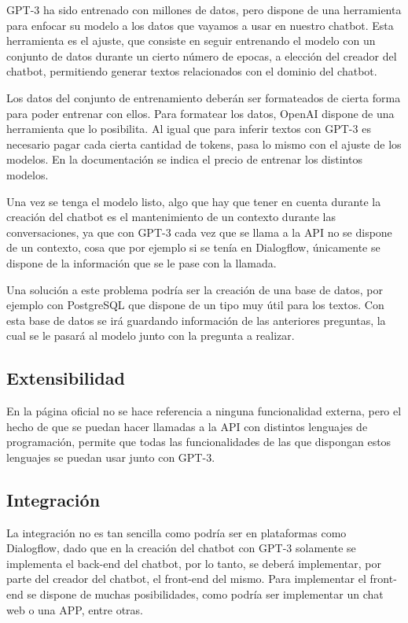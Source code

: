 GPT-3 ha sido entrenado con millones de datos, pero dispone de una herramienta para enfocar su modelo a los datos que vayamos a usar en nuestro chatbot. Esta herramienta es el ajuste, que consiste en seguir entrenando el modelo con un conjunto de datos durante un cierto número de \gls{epocas}, a elección del creador del chatbot, permitiendo generar textos relacionados con el dominio del chatbot.

Los datos del conjunto de entrenamiento deberán ser formateados de cierta forma para poder entrenar con ellos. Para formatear los datos, OpenAI dispone de una herramienta que lo posibilita. Al igual que para inferir textos con GPT-3 es necesario pagar cada cierta cantidad de tokens, pasa lo mismo con el ajuste de los modelos. En la documentación \cite{RefWorks:RefID:25-openai.} se indica el precio de entrenar los distintos modelos.

Una vez se tenga el modelo listo, algo que hay que tener en cuenta durante la creación del chatbot es el mantenimiento de un contexto durante las conversaciones, ya que con GPT-3 cada vez que se llama a la \gls{API} no se dispone de un contexto, cosa que por ejemplo si se tenía en Dialogflow, únicamente se dispone de la información que se le pase con la llamada.

Una solución a este problema podría ser la creación de una base de datos, por ejemplo con PostgreSQL que dispone de un tipo muy útil para los textos. Con esta base de datos se irá guardando información de las anteriores preguntas, la cual se le pasará al modelo junto con la pregunta a realizar.

\subsection*{Extensibilidad}

En la página oficial no se hace referencia a ninguna funcionalidad externa, pero el hecho de que se puedan hacer llamadas a la \gls{API} con distintos lenguajes de programación, permite que todas las funcionalidades de las que dispongan estos lenguajes se puedan usar junto con GPT-3.

\subsection*{Integración}

La integración no es tan sencilla como podría ser en plataformas como Dialogflow, dado que en la creación del chatbot con GPT-3 solamente se implementa el \gls{back-end} del chatbot, por lo tanto, se deberá implementar, por parte del creador del chatbot, el \gls{front-end} del mismo. Para implementar el \gls{front-end} se dispone de muchas posibilidades, como podría ser implementar un chat web o una APP, entre otras.

